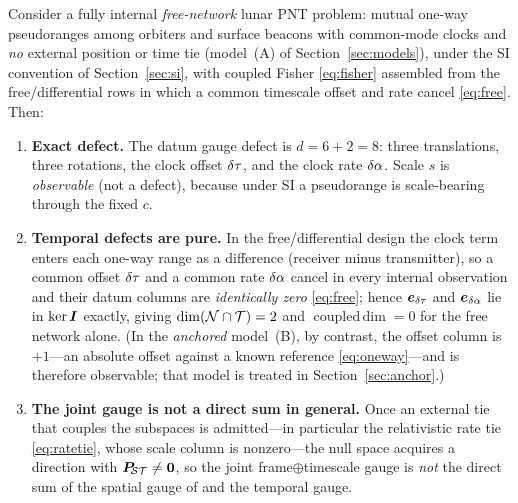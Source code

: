 \begin{theorem}
\label{thm:classify}
Consider a fully internal \emph{free-network} lunar PNT problem: mutual one-way
pseudoranges among orbiters and surface beacons with common-mode clocks and \emph{no}
external position or time tie (model~(A) of Section~\ref{sec:models}), under the SI
convention of Section~\ref{sec:si}, with coupled Fisher \eqref{eq:fisher} assembled from the
free/differential rows in which a common timescale offset and rate cancel \eqref{eq:free}.
Then:
\begin{enumerate}
\item[(i)] \textbf{Exact defect.} The datum gauge defect is
$d=6+2=8$: three translations, three rotations, the clock offset $\delta\tau$, and the clock
rate $\delta\alpha$. Scale $s$ is \emph{observable} (not a defect), because under SI a
pseudorange is scale-bearing through the fixed $c$.
\item[(ii)] \textbf{Temporal defects are pure.} In the free/differential design the clock
term enters each one-way range as a difference (receiver minus transmitter), so a common
offset $\delta\tau$ and a common rate $\delta\alpha$ cancel in every internal observation and their
datum columns are \emph{identically zero} \eqref{eq:free}; hence $\bm e_{\delta\tau}$ and
$\bm e_{\delta\alpha}$ lie in $\ker\bm{I}$ exactly, giving $\dim(\mathcal{N}\cap\mathcal{T})=2$ and
$\operatorname{coupled\,dim}=0$ for the free network alone. (In the \emph{anchored} model~(B),
by contrast, the offset column is $+1$---an absolute offset against a known reference
\eqref{eq:oneway}---and is therefore observable; that model is treated in
Section~\ref{sec:anchor}.)
\item[(iii)] \textbf{The joint gauge is not a direct sum in general.} Once an external tie
that couples the subspaces is admitted---in particular the relativistic rate tie
\eqref{eq:ratetie}, whose scale column is nonzero---the null space acquires a direction with
$\bm{P}_{\!\mathcal{S}\mathcal{T}}\neq\bm0$, so the joint frame$\oplus$timescale gauge is \emph{not} the direct sum of
the spatial gauge of \citep{baweja2026datum} and the temporal gauge.
\end{enumerate}
\end{theorem}

